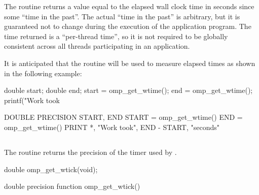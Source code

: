 \effect
The  routine returns a value equal to the elapsed wall clock time in
seconds since some ``time in the past''. The actual ``time in the past'' is arbitrary, but it is
guaranteed not to change during the execution of the application program. The time
returned is a ``per-thread time'', so it is not required to be globally consistent across all
threads participating in an application.

\begin{note}
It is anticipated that the routine will be used to measure elapsed times as shown
in the following example:

\begin{ccppspecific}
\begin{ompcFunction}
double start;
double end;
start = omp_get_wtime();
end = omp_get_wtime();
printf("Work took %
\end{ompcFunction}
\end{ccppspecific}

\begin{fortranspecific}
\begin{ompcFunction}
DOUBLE PRECISION START, END
START = omp_get_wtime()
END = omp_get_wtime()
PRINT *, "Work took", END - START, "seconds"
\end{ompcFunction}
\end{fortranspecific}
\end{note}









\subsection{}
\label{subsec:omp_get_wtick}
\summary
The  routine returns the precision of the timer used by
.


\format
\begin{ccppspecific}
\begin{ompcFunction}
double omp_get_wtick(void);
\end{ompcFunction}
\end{ccppspecific}

\begin{fortranspecific}
\begin{ompfFunction}
double precision function omp_get_wtick()
\end{ompfFunction}
\end{fortranspecific}

